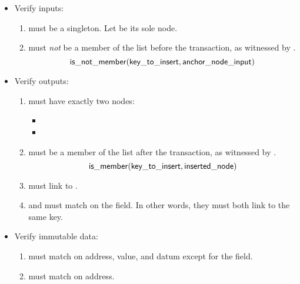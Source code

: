 \documentclass[../midgard.tex]{subfiles}
\begin{document}
\begin{description}
\begin{itemize}
            \item Verify inputs:
            \begin{enumerate}[resume]
                \item {} must be a singleton. Let  be its sole node.
                \item {} must \emph{not} be a member of the list before the transaction, as witnessed by .
                    \begin{equation*}
                        \mathsf{is\_not\_member} (\mathsf{key\_to\_insert}, \mathsf{anchor\_node\_input})
                    \end{equation*}
            \end{enumerate}
            
            \item Verify outputs:
            \begin{enumerate}[resume]
                \item {} must have exactly two nodes:
                    \begin{itemize}
                        \item {}
                        \item {}  
                    \end{itemize}
                \item {} must be a member of the list after the transaction, as witnessed by .
                    \begin{equation*}
                        \mathsf{is\_member} (\mathsf{key\_to\_insert}, \mathsf{inserted\_node})
                    \end{equation*}
                \item {} must link to .
                \item {} and  must match on the  field. In other words, they must both link to the same key.
            \end{enumerate}
            
            \item Verify immutable data:
            \begin{enumerate}[resume]
                \item {} must match  on address, value, and datum except for the  field.
                \item {} must match  on address.
            \end{enumerate}
        \end{itemize}
        

\end{description}
\end{document}

